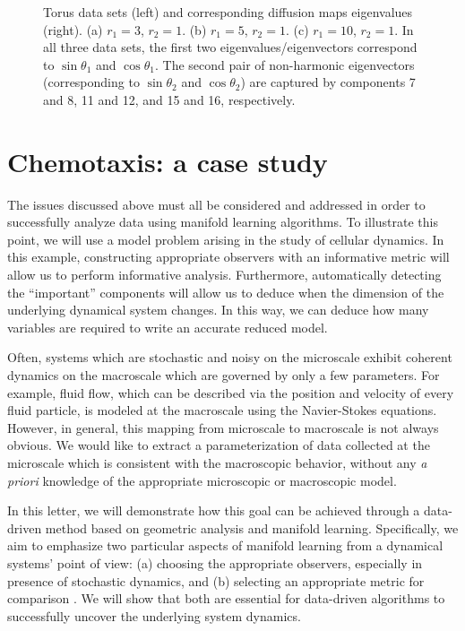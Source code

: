 \documentclass[preprint]{elsarticle}
\begin{document}
\begin{figure}[t]
\begin{subfigure}{\textwidth}
\caption{}
\end{subfigure}
%
\caption{Torus data sets (left) and corresponding diffusion maps eigenvalues (right). (a) $r_1 = 3$, $r_2 = 1$. (b) $r_1 = 5$, $r_2 = 1$. (c) $r_1 = 10$, $r_2 = 1$. In all three data sets, the first two eigenvalues/eigenvectors correspond to $\sin \theta_1$ and $\cos \theta_1$. The second pair of non-harmonic eigenvectors (corresponding to $\sin \theta_2$ and $\cos \theta_2$) are captured by components 7 and 8, 11 and 12, and 15 and 16, respectively.}
%
\label{fig:torus}
%
\end{figure}


\section{Chemotaxis: a case study}

The issues discussed above must all be considered and addressed in order to successfully analyze data using manifold learning algorithms. 
%
To illustrate this point, we will use a model problem arising in the study of cellular dynamics. 
%
In this example, constructing appropriate observers with an informative metric will allow us to perform informative analysis. 
%
Furthermore, automatically detecting the ``important'' components will allow us to deduce when the dimension of the underlying dynamical system changes. 
%
In this way, we can deduce how many variables are required to write an accurate reduced model. 

Often, systems which are stochastic and noisy on the microscale exhibit coherent dynamics on the macroscale which are governed by only a few parameters.
%
For example, fluid flow, which can be described via the position and velocity of every fluid particle, is modeled at the macroscale using the Navier-Stokes equations.
%
However, in general, this mapping from microscale to macroscale is not always obvious.
%
We would like to extract a parameterization of data collected at the microscale which is consistent with the macroscopic behavior, without any {\em a priori} knowledge of the appropriate microscopic or macroscopic model.

In this letter, we will demonstrate how this goal can be achieved through a data-driven method based on geometric analysis and manifold learning. 
%
Specifically, we aim to emphasize two particular aspects of manifold learning from a dynamical systems' point of view: (a) choosing the appropriate observers, especially in presence of stochastic dynamics, and (b) selecting an appropriate metric for comparison \cite{mallat2012group}. 
%
We will show that both are essential for data-driven algorithms to successfully uncover the underlying system dynamics. 
\end{document}
